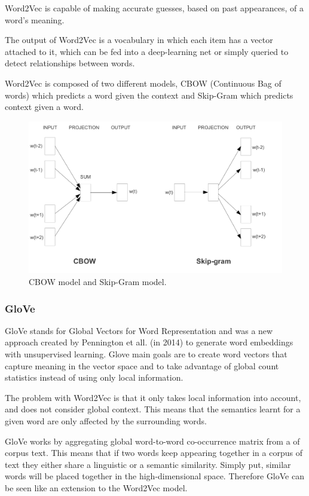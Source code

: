         
        \par Word2Vec is capable of making accurate guesses, based on past appearances, of a word's meaning. 

        \par The output of Word2Vec is a vocabulary in which each item has a vector attached to it, which can be fed into a deep-learning net or simply queried to detect relationships between words.

        \par Word2Vec is composed of two different models, CBOW (Continuous Bag of words) which predicts a word given the context and Skip-Gram which predicts context given a word. \cite{Mikolov2013} \cite{Wiki}

        

        \begin{figure}[htb]
            \centering
            \includegraphics[scale = 0.15]{Sections/3StateOfTheArt/3_images/Cbow_Skip.png}
            \caption{CBOW model and Skip-Gram model. \cite{Mikolov2013}} 
        \end{figure}

        
        \subsubsection{GloVe}
            \par GloVe stands for Global Vectors for Word Representation and was a new approach created by Pennington et all. (in 2014) \cite{Pennington2014} to generate word embeddings with unsupervised learning. Glove main goals are to create word vectors that capture meaning in the vector space and to take advantage of global count statistics instead of using only local information. 
            \par The problem with Word2Vec is that it only takes local information into account, and does not consider global context. This means that the semantics learnt for a given word are only affected by the surrounding words. 
            \par GloVe works by aggregating global word-to-word co-occurrence matrix from a of corpus text. This means that if two words keep appearing together in a corpus of text they either share a linguistic or a semantic similarity. Simply put, similar words will be placed together in the high-dimensional space. Therefore GloVe can be seen like an extension to the Word2Vec model.

